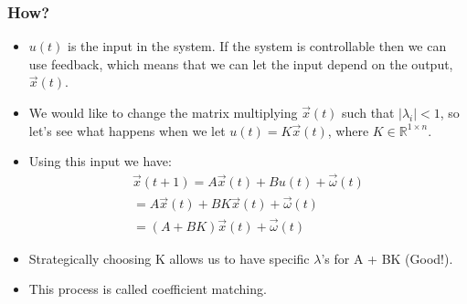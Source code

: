 \documentclass{beamer}
\newcommand{\R}{\mathbb{R}}
\begin{document}
	\begin{frame}
	\frametitle{How?}
	\begin{itemize}
	    \item $u(t)$ is the input in the system. If the system is controllable then we can use feedback, which means that we can let the input depend on the output, $\vec{x}(t)$.
	    \item We would like to change the matrix multiplying $\vec{x}(t)$ such that  $|\lambda_i|<1$, so let's see what happens when we let $u(t) = K\vec{x}(t)$, where $K \in \R^{1 \times n}$.
	    \item Using this input we have: 
	    \begin{align*}
	        \vec{x}(t+1) = A\vec{x}(t) + Bu(t) + \vec{\omega}(t)\\
	        = A\vec{x}(t) + BK\vec{x}(t) + \vec{\omega}(t)\\
	        = (A + BK)\vec{x}(t) + \vec{\omega}(t)
	    \end{align*}
	  
	    \item Strategically choosing K allows us to have specific $\lambda$'s for A + BK (Good!).
	    \item This process is called coefficient matching. 
	\end{itemize}
	\end{frame}
\end{document}

